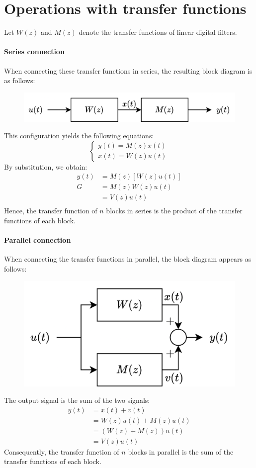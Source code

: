 \section{Operations with transfer functions}

Let $W(z)$ and $M(z)$ denote the transfer functions of linear digital filters.

\paragraph*{Series connection}
When connecting these transfer functions in series, the resulting block diagram is as follows:
\begin{figure}[H]
    \centering
    \includegraphics[width=0.75\linewidth]{images/series.png}
\end{figure}
This configuration yields the following equations:
\[\begin{cases}
    y(t)=M(z)x(t) \\
    x(t)=W(z)u(t)
\end{cases}\]
By substitution, we obtain:
\begin{align*}
    y(t)    &=M(z)\left[ W(z)u(t) \right] \\G
            &=M(z)W(z)u(t) \\
            &=V(z)u(t) \\
\end{align*}
Hence, the transfer function of $n$ blocks in series is the product of the transfer functions of each block.

\paragraph*{Parallel connection}
When connecting the transfer functions in parallel, the block diagram appears as follows:
\begin{figure}[H]
    \centering
    \includegraphics[width=0.5\linewidth]{images/parallel.png}
\end{figure}
The output signal is the sum of the two signals:
\begin{align*}
    y(t)    &=x(t)+v(t) \\
            &=W(z)u(t)+M(z)u(t) \\
            &=\left(W(z)+M(z)\right)u(t) \\
            &=V(z)u(t)
\end{align*}
Consequently, the transfer function of $n$ blocks in parallel is the sum of the transfer functions of each block.